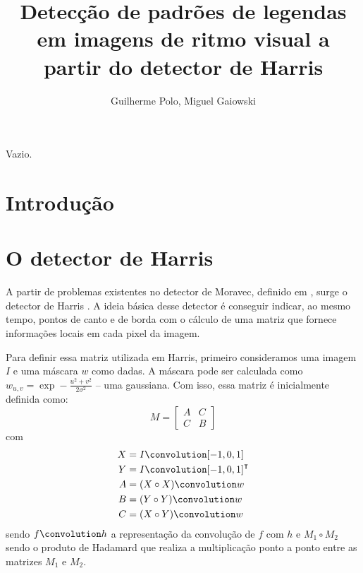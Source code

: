 \documentclass[12pt]{article}
\title{Detecção de padrões de legendas em imagens de ritmo visual a partir
do detector de Harris}
\author{Guilherme Polo\inst{1}, Miguel Gaiowski\inst{1}}
\begin{document}
\maketitle

\begin{resumo}
  Vazio.
\end{resumo}


\section{Introdução}

\cite{harris}


\section{O detector de Harris}

A partir de  problemas existentes no detector de  Moravec, definido em
\cite{moravec},  surge o  detector  de Harris  \cite{harris}. A  ideia
básica desse detector  é conseguir indicar, ao mesmo  tempo, pontos de
canto e de  borda com o cálculo de uma  matriz que fornece informações
locais em cada pixel da imagem.



Para definir essa matriz utilizada em Harris, primeiro consideramos uma
imagem $I$ e uma máscara $w$  como dadas. A máscara pode ser calculada
como   $w_{u,v}  =   \exp   -\frac{u^2  +   v^2}{2\sigma^2}$  --   uma
gaussiana. Com isso, essa matriz é inicialmente definida como:
\[
M = \begin{bmatrix}
  A & C \\
  C & B
\end{bmatrix}
\]
com
\begin{align*}
  X & = I \convolution [-1, 0, 1] \\
  Y & = I \convolution [-1, 0, 1]^\intercal \\
  A & = (X \circ X) \convolution w \\
  B & = (Y \circ Y) \convolution w \\
  C & = (X \circ Y) \convolution w
\end{align*}
sendo $f \convolution h$ a  representação da convolução de $f$ com $h$
e  $M_1  \circ  M_2$  sendo  o  produto  de  Hadamard  que  realiza  a
multiplicação ponto a ponto entre as matrizes $M_1$ e $M_2$.
\end{document}
